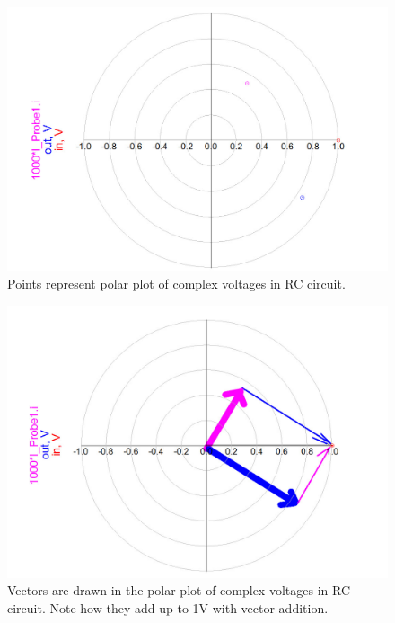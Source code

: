 \documentclass{ximera}
\begin{document}
\begin{example}
\begin{explanation}
\begin{figure}[htbp]
\begin{center}
\includegraphics[scale=0.2]{../jpg/RCvoltPolarPlotADS.jpg}
\end{center}
\caption{\label{PP} Points represent polar plot of complex voltages in RC circuit.}
\end{figure}


\begin{figure}[htbp]
\begin{center}
\includegraphics[scale=0.2]{../jpg/RCvoltPolarPlotVectors.jpg}
\end{center}
\caption{\label{f112} Vectors are drawn in the polar plot of complex voltages in RC circuit. Note how they add up to 1V with vector addition.}
\end{figure}





\end{explanation}



\end{example}
\end{document}
